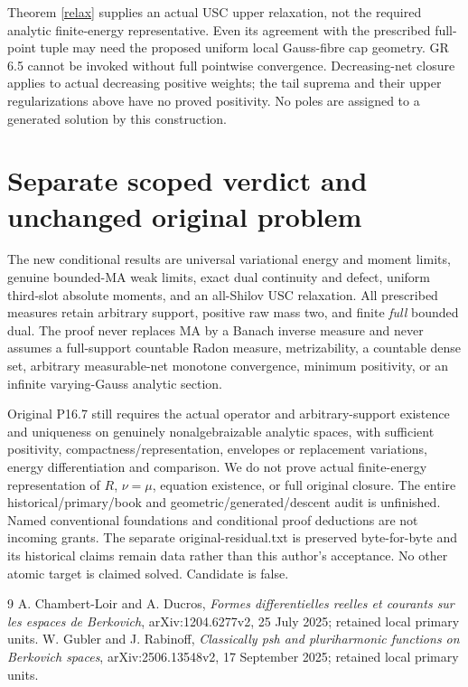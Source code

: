 \documentclass[11pt]{article}
\begin{document}
Theorem \ref{relax} supplies an actual USC upper relaxation, not the
required analytic finite-energy representative. Even its agreement with
the prescribed full-point tuple may need the proposed uniform local
Gauss-fibre cap geometry. GR 6.5 cannot be invoked without full pointwise
convergence. Decreasing-net closure applies to actual decreasing
positive weights; the tail suprema and their upper regularizations above
have no proved positivity. No poles are assigned to a generated solution
by this construction.

\section{Separate scoped verdict and unchanged original problem}
The new conditional results are universal variational energy and moment
limits, genuine bounded-MA weak limits, exact dual continuity and defect,
uniform third-slot absolute moments, and an all-Shilov USC relaxation.
All prescribed measures retain arbitrary support, positive raw mass two,
and finite \emph{full} bounded dual. The proof never replaces MA by a
Banach inverse measure and never assumes a full-support countable Radon
measure, metrizability, a countable dense set, arbitrary measurable-net
monotone convergence, minimum positivity, or an infinite varying-Gauss
analytic section.

Original P16.7 still requires the actual operator and arbitrary-support
existence and uniqueness on genuinely nonalgebraizable analytic spaces,
with sufficient positivity, compactness/representation, envelopes or
replacement variations, energy differentiation and comparison. We do not
prove actual finite-energy representation of $R$, $\nu=\mu$, equation
existence, or full original closure. The entire historical/primary/book
and geometric/generated/descent audit is unfinished. Named conventional
foundations and conditional proof deductions are not incoming grants.
The separate original-residual.txt is preserved byte-for-byte and its
historical claims remain data rather than this author's acceptance.
No other atomic target is claimed solved. Candidate is false.

\begin{thebibliography}{9}
 A. Chambert-Loir and A. Ducros, \emph{Formes differentielles
reelles et courants sur les espaces de Berkovich}, arXiv:1204.6277v2,
25 July 2025; retained local primary units.
 W. Gubler and J. Rabinoff, \emph{Classically psh and
pluriharmonic functions on Berkovich spaces}, arXiv:2506.13548v2,
17 September 2025; retained local primary units.
\end{thebibliography}
\end{document}

